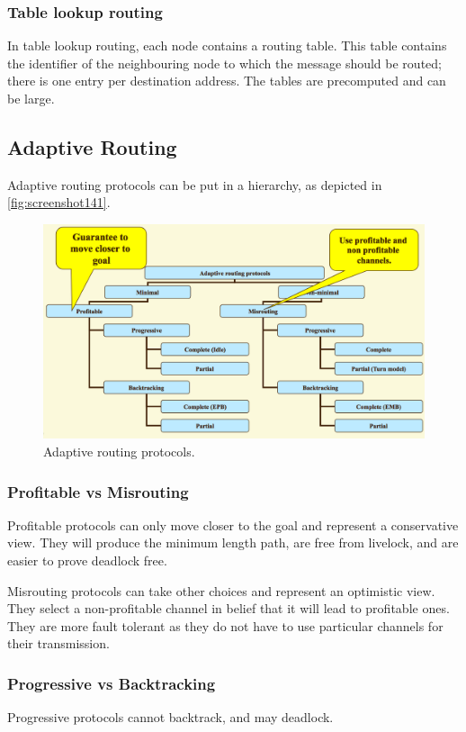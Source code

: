 \subsubsection{Table lookup routing}
In table lookup routing, each node contains a routing table. This table contains the identifier of the neighbouring node to which the message should be routed; there is one entry per destination address. The tables are precomputed and can be large.

\subsection{Adaptive Routing}
Adaptive routing protocols can be put in a hierarchy, as depicted in \autoref{fig:screenshot141}.

\begin{figure}
\centering
\includegraphics[width=0.7\linewidth]{figures/screenshot141}
\caption{Adaptive routing protocols.}
\label{fig:screenshot141}
\end{figure}

\subsubsection{Profitable vs Misrouting}
Profitable protocols can only move closer to the goal and represent a conservative view. They will produce the minimum length path, are free from livelock, and are easier to prove deadlock free.

Misrouting protocols can take other choices and represent an optimistic view. They select a non-profitable channel in belief that it will lead to profitable ones. They are more fault tolerant as they do not have to use particular channels for their transmission.

\subsubsection{Progressive vs Backtracking}
Progressive protocols cannot backtrack, and may deadlock.

